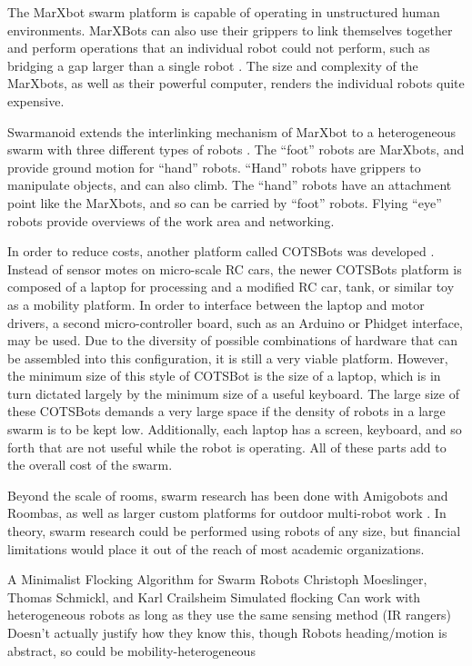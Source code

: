The MarXbot swarm platform is capable of operating in unstructured human environments. 
MarXBots can also use their grippers to link themselves together and perform operations that an individual robot could not perform, such as bridging a gap larger than a single robot \cite{bonani2010marxbot}. 
The size and complexity of the MarXbots, as well as their powerful computer, renders the individual robots quite expensive. 

Swarmanoid extends the interlinking mechanism of MarXbot to a heterogeneous swarm with three different types of robots \cite{dorigo2013swarmanoid}.
The ``foot'' robots are MarXbots, and provide ground motion for ``hand'' robots. 
``Hand'' robots have grippers to manipulate objects, and can also climb.
The ``hand'' robots have an attachment point like the MarXbots, and so can be carried by ``foot'' robots. 
Flying ``eye'' robots provide overviews of the work area and networking.  

In order to reduce costs, another platform called COTSBots was developed \cite{soule2011cotsbots}.  
Instead of sensor motes on micro-scale RC cars, the newer COTSBots platform is composed of a laptop for processing and a modified RC car, tank, or similar toy as a mobility platform.
In order to interface between the laptop and motor drivers, a second micro-controller board, such as an Arduino or Phidget interface, may be used. 
Due to the diversity of possible combinations of hardware that can be assembled into this configuration, it is still a very viable platform. 
However, the minimum size of this style of COTSBot is the size of a laptop, which is in turn dictated largely by the minimum size of a useful keyboard. 
The large size of these COTSBots demands a very large space if the density of robots in a large swarm is to be kept low. 
Additionally, each laptop has a screen, keyboard, and so forth that are not useful while the robot is operating. 
All of these parts add to the overall cost of the swarm. 

Beyond the scale of rooms, swarm research has been done with Amigobots and Roombas, as well as larger custom platforms for outdoor multi-robot work \cite{guo2007bio, tammet2008rfid, olson2013cacm}.
In theory, swarm research could be performed using robots of any size, but financial limitations would place it out of the reach of most academic organizations. 

A Minimalist Flocking Algorithm for Swarm Robots
Christoph Moeslinger, Thomas Schmickl, and Karl Crailsheim
	Simulated flocking 
	Can work with heterogeneous robots as long as they use the same sensing method (IR rangers)
		Doesn't actually justify how they know this, though
		Robots heading/motion is abstract, so could be mobility-heterogeneous

